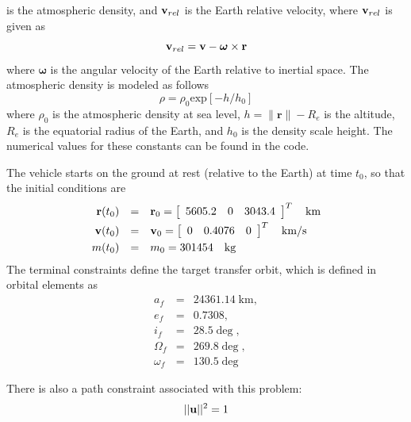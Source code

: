 \documentclass[a4paper,11pt]{report}    %
\begin{document}
is the atmospheric density, and ${\bf v}_{rel}$ is the Earth relative
velocity, where ${\bf v}_{rel}$ is given as
\begin{equation}
{\bf v}_{rel} = {\bf v}-\boldsymbol{\omega} \times {\bf r}
\end{equation}
where $\boldsymbol\omega$ is the angular velocity of the Earth relative to
inertial space.  The atmospheric density is modeled as follows
\begin{equation}
\rho = \rho_0\mbox{exp}[-h/h_0]
\end{equation}
where $\rho_0$ is the atmospheric density at sea level, $h=\|\mathbf{r}\|-R_e$ is
the altitude, $R_e$ is the equatorial radius of the Earth, and $h_0$ is the
density scale height.  The numerical values for these constants can be found
in the code.

The vehicle starts on the ground at rest (relative to the Earth) at time $t_0$, so that the initial conditions are
\begin{equation}\label{ICs}
\begin{array}{rcl}
{\bf r}(t_0) &=& {\bf r}_0 = \left[ \begin{array}{ccc} 5605.2 & 0 & 3043.4 \end{array} \right] ^T\quad \mbox{km} \vspace{3pt}\\
{\bf v}(t_0) &=& {\bf v}_0 = \left[ \begin{array}{ccc} 0 & 0.4076 & 0 \end{array} \right]^T \quad \mbox{km/s} \vspace{3pt}\\
m(t_0) &=& m_0 = 301454 \quad \mbox{kg}
\end{array}
\end{equation}
The terminal constraints define the target transfer orbit, which is defined in
orbital elements as
\begin{equation}\label{FCs}
\begin{array}{rcl}
 a_f &=   &  24361.14 \; \mbox{km}, \\
 e_f &=   &  0.7308, \\
 i_f &=   &  28.5\deg,\\
 \Omega_f &= & 269.8\deg, \\
 \omega_f &= & 130.5\deg
\end{array}
\end{equation}


There is also a  path constraint associated with this problem:
\begin{equation}\label{upath}
||{\bf u}||^2 = 1
\end{equation}
\end{document}
